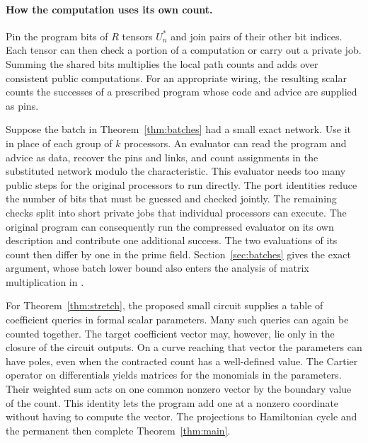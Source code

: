 \paragraph{How the computation uses its own count.}
Pin the program bits of $R$ tensors $U_n^*$ and join pairs of their
other bit indices. Each tensor can then check a portion of a
computation or carry out a private job. Summing the shared bits
multiplies the local path counts and adds over consistent public
computations. For an appropriate wiring, the resulting scalar counts
the successes of a prescribed program whose code and advice are
supplied as pins.

Suppose the batch in Theorem~\ref{thm:batches} had a small exact
network. Use it in place of each group of $k$ processors. An evaluator
can read the program and advice as data, recover the pins and links,
and count assignments in the substituted network modulo the
characteristic. This evaluator needs too many public steps for the
original processors to run directly. The port identities reduce the
number of bits that must be guessed and checked jointly. The remaining
checks split into short private jobs that individual processors can
execute. The original program can consequently run the compressed
evaluator on its own description and contribute one additional
success. The two evaluations of its count then differ by one in the
prime field. Section~\ref{sec:batches} gives the exact argument, whose
batch lower bound also enters the analysis of matrix multiplication
in \cite{oaM}.

For Theorem~\ref{thm:stretch}, the proposed small circuit supplies a
table of coefficient queries in formal scalar parameters. Many such
queries can again be counted together. The target coefficient vector
may, however, lie only in the closure of the circuit outputs. On a
curve reaching that vector the parameters can have poles, even
when the contracted count has a well-defined value. The Cartier
operator on differentials yields matrices for the monomials in the
parameters. Their weighted sum acts on one common nonzero vector by
the boundary value of the count. This identity lets the program add
one at a nonzero coordinate without having to compute the vector.
The projections to Hamiltonian cycle and the permanent then complete
Theorem~\ref{thm:main}.
